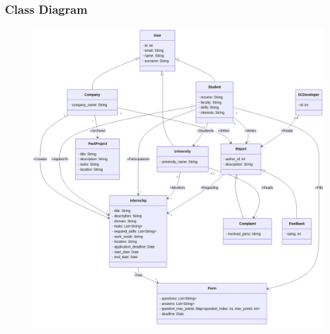\documentclass[11pt,twoside]{article}
\begin{document}
		\subsubsection{Class Diagram}
\begin{figure}[H]
\includegraphics[width=\textwidth]{Images/Class_Diagram}
\end{figure}
\newpage
\end{document}
